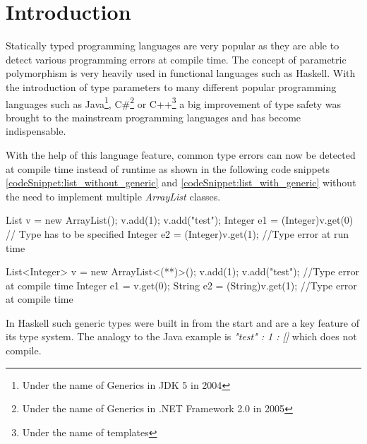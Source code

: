 \section{Introduction}\label{section:introduction}
Statically typed programming languages are very popular as they are able to detect various programming errors at compile time.
The concept of parametric polymorphism is very heavily used in functional languages such as Haskell. With the introduction of type parameters to many different popular programming languages such as Java\footnote{Under the name of Generics in JDK 5 in 2004\cite{JDK5}},
 C\#\footnote{Under the name of Generics in .NET Framework 2.0 in 2005\cite{dotnet20}} or C++\footnote{Under the name of templates} a big improvement of type safety was brought to the mainstream programming languages and has become indispensable.

With the help of this language feature, common type errors can now be detected at compile time instead of runtime as shown in the following code snippets \ref{codeSnippet:list_without_generic} and \ref{codeSnippet:list_with_generic} without the need to implement multiple \emph{ArrayList} classes.

\begin{adjustbox}{width=\columnwidth}
\begin{codesnippet}[caption={List without generic argument in Java}, label={codeSnippet:list_without_generic}]
List v = new ArrayList();
v.add(1);
v.add("test");
Integer e1 = (Integer)v.get(0) // Type has to be specified
Integer e2 = (Integer)v.get(1); //Type error at run time
\end{codesnippet}
\end{adjustbox}
\begin{adjustbox}{width=\columnwidth}
\begin{codesnippet}[escapeinside={(*}{*)}, caption={List with type argument in Java}, label={codeSnippet:list_with_generic}]
List<Integer> v = new ArrayList<(**)>();
v.add(1);
v.add("test"); //Type error at compile time
Integer e1 = v.get(0);
String e2 = (String)v.get(1); //Type error at compile time
\end{codesnippet}
\end{adjustbox}
\linebreak

In Haskell such generic types were built in from the start and are a key feature of its type system. The analogy to the Java example is \emph{"test" : 1 : []} which does not compile.

